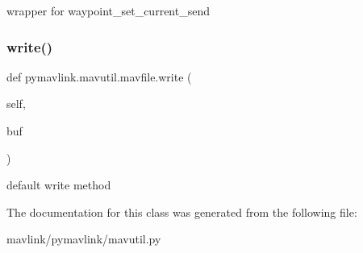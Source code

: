 \begin{DoxyVerb}wrapper for waypoint_set_current_send\end{DoxyVerb}
 \mbox{\label{classpymavlink_1_1mavutil_1_1mavfile_a8f40348c156083384c07dfa73cf92a62}} 
\subsubsection{\texorpdfstring{write()}{write()}}
{\footnotesize\ttfamily def pymavlink.\+mavutil.\+mavfile.\+write (\begin{DoxyParamCaption}\item[{}]{self,  }\item[{}]{buf }\end{DoxyParamCaption})}

\begin{DoxyVerb}default write method\end{DoxyVerb}
 

The documentation for this class was generated from the following file\+:\begin{DoxyCompactItemize}
\item 
mavlink/pymavlink/mavutil.\+py\end{DoxyCompactItemize}
